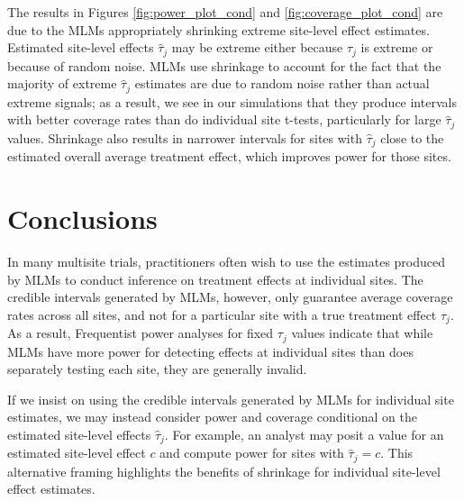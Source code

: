 \documentclass[]{article}
\begin{document}
The results in Figures \ref{fig:power_plot_cond} and \ref{fig:coverage_plot_cond} are due to the MLMs appropriately shrinking extreme site-level effect estimates.
Estimated site-level effects $\hat{\tau}_j$ may be extreme either because $\tau_j$ is extreme or because of random noise.
MLMs use shrinkage to account for the fact that the majority of extreme $\hat{\tau}_j$ estimates are due to random noise rather than actual extreme signals; as a result, we see in our simulations that they produce intervals with better coverage rates than do individual site t-tests, particularly for large $\hat{\tau}_j$ values.
Shrinkage also results in narrower intervals for sites with $\hat{\tau}_j$ close to the estimated overall average treatment effect, which improves power for those sites.


\section{Conclusions}

In many multisite trials, practitioners often wish to use the estimates produced by MLMs to conduct inference on treatment effects at individual sites.
The credible intervals generated by MLMs, however, only guarantee average coverage rates across all sites, and not for a particular site with a true treatment effect $\tau_j$.
As a result, Frequentist power analyses for fixed $\tau_j$ values indicate that while MLMs have more power for detecting effects at individual sites than does separately testing each site, they are generally invalid.

If we insist on using the credible intervals generated by MLMs for individual site estimates, we may instead consider power and coverage conditional on the estimated site-level effects $\hat{\tau}_j$.
For example, an analyst may posit a value for an estimated site-level effect $c$ and compute power for sites with $\hat{\tau}_j = c$.
This alternative framing highlights the benefits of shrinkage for individual site-level effect estimates.



	
\end{document}
